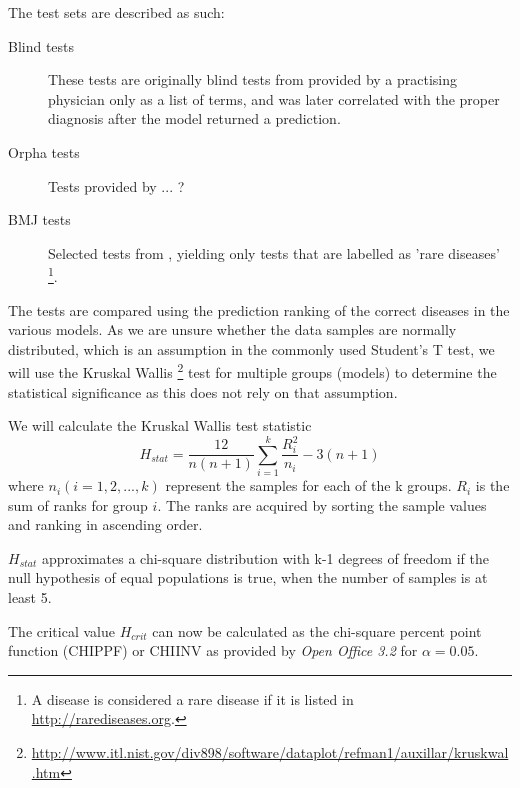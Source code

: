 \documentclass[10pt,letterpaper,final]{article}
\begin{document}
The test sets are described as such:
\begin{description}
\item[Blind tests] These tests are originally blind tests from
\cite{jensenandersen} provided by a practising physician only as a list
of terms, and was later correlated with the proper diagnosis after the
model returned a prediction.
\item[Orpha tests] Tests provided by ... ?
\item[BMJ tests] Selected tests from \cite{googlingdiagnosis}, yielding
only tests that are labelled as 'rare diseases' \footnote{A disease is
considered a rare disease if it is listed in
\url{http://rarediseases.org}.}.
\end{description}



The tests are compared using the prediction ranking of the correct
diseases in the various models. As we are unsure whether the data
samples are normally distributed, which is an assumption in the commonly
used Student's T test, we will use the Kruskal Wallis
\footnote{\url{http://www.itl.nist.gov/div898/software/dataplot/refman1/auxillar/kruskwal.htm}}
test for multiple groups (models) to determine the statistical
significance as this does not rely on that assumption.

We will calculate the Kruskal Wallis test statistic
\[
H_{stat} = \frac{12}{n(n+1)}\sum\limits_{i = 1}^{k} \frac{R^{2}_{i}}{n_{i}} - 3(n+1)
\]
where $n_{i} (i = 1, 2, ..., k)$ represent the samples for each of
the k groups. $R_{i}$ is the sum of ranks for group $i$. The ranks are
acquired by sorting the sample values and ranking in ascending order.

$H_{stat}$ approximates a chi-square distribution with k-1 degrees of
freedom if the null hypothesis of equal populations is true, when the
number of samples is at least 5.

The critical value $H_{crit}$ can now be calculated as the chi-square
percent point function (CHIPPF) or CHIINV as provided by \textit{Open
Office 3.2} for $\alpha = 0.05$.
\end{document}
